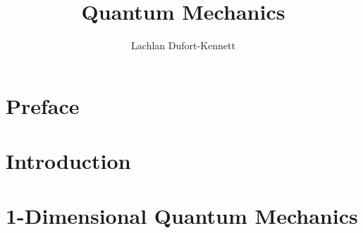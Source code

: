 \documentclass[12pt]{report}
\title{Quantum Mechanics}
\author{Lachlan Dufort-Kennett}
\theoremstyle{theorem}
\theoremstyle{def}
\begin{document}
    \maketitle
    \setcounter{tocdepth}{1}
    \tableofcontents

    \chapter*{Preface}

    \chapter{Introduction}
    
    \chapter{1-Dimensional Quantum Mechanics}
    

    \nocite{*}
    
    
\end{document}
